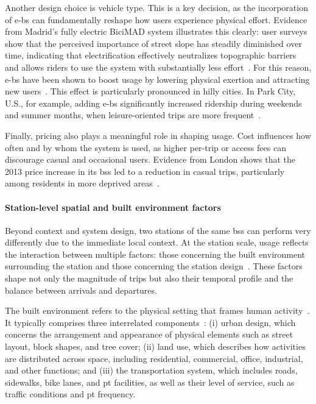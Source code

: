         Another design choice is vehicle type. This is a key decision, as the incorporation of \acp{e-b} can fundamentally reshape how users experience physical effort. Evidence from Madrid’s fully electric BiciMAD system illustrates this clearly: user surveys show that the perceived importance of street slope has steadily diminished over time, indicating that electrification effectively neutralizes topographic barriers and allows riders to use the system with substantially less effort~\cite{Julio2022}. For this reason, \acp{e-b} have been shown to boost usage by lowering physical exertion and attracting new users~\cite{Fyhri2015}. This effect is particularly pronounced in hilly cities. In Park City, U.S., for example, adding \acp{e-b} significantly increased ridership during weekends and summer months, when leisure-oriented trips are more frequent~\cite{He2019}.

        Finally, pricing also plays a meaningful role in shaping usage. Cost influences how often and by whom the system is used, as higher per-trip or access fees can discourage casual and occasional users. Evidence from London shows that the 2013 price increase in its \ac{bss} led to a reduction in casual trips, particularly among residents in more deprived areas~\cite{Goodman2014}.


        \paragraph{Station-level spatial and built environment factors\\}

        Beyond context and system design, two stations of the same \ac{bss} can perform very differently due to the immediate local context. At the station scale, usage reflects the interaction between multiple factors: those concerning the built environment surrounding the station and those concerning the station design~\cite{Guo2022, Guo2020, Liu2019, Ma2020_comparison, Chen2021_Identifying}. These factors shape not only the magnitude of trips but also their temporal profile and the balance between arrivals and departures.

        The built environment refers to the physical setting that frames human activity~\cite{Guo2022}. It typically comprises three interrelated components~\cite{Handy2002}: (i) urban design, which concerns the arrangement and appearance of physical elements such as street layout, block shapes, and tree cover; (ii) land use, which describes how activities are distributed across space, including residential, commercial, office, industrial, and other functions; and (iii) the transportation system, which includes roads, sidewalks, bike lanes, and \ac{pt} facilities, as well as their level of service, such as traffic conditions and \ac{pt} frequency.

